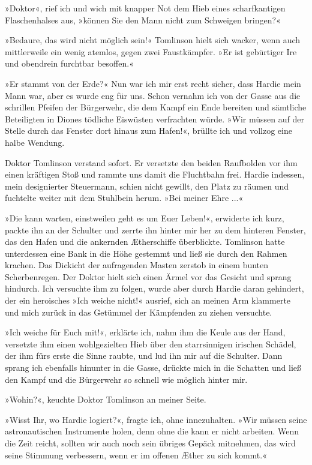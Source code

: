 »Doktor«, rief ich und wich mit knapper Not dem Hieb eines
scharfkantigen Flaschenhalses aus, »können Sie den Mann nicht zum
Schweigen bringen?«

»Bedaure, das wird nicht möglich sein!« Tomlinson hielt sich
wacker, wenn auch mittlerweile ein wenig atemlos, gegen zwei
Faustkämpfer. »Er ist gebürtiger Ire und obendrein furchtbar
besoffen.«

»Er stammt von der Erde?« Nun war ich mir erst recht sicher, dass
Hardie mein Mann war, aber es wurde eng für uns. Schon vernahm ich
von der Gasse aus die schrillen Pfeifen der Bürgerwehr, die dem
Kampf ein Ende bereiten und sämtliche Beteiligten in Diones
tödliche Eiswüsten verfrachten würde. »Wir müssen auf der Stelle
durch das Fenster dort hinaus zum Hafen!«, brüllte ich und vollzog
eine halbe Wendung.

Doktor Tomlinson verstand sofort. Er versetzte den beiden
Raufbolden vor ihm einen kräftigen Stoß und rammte uns damit die
Fluchtbahn frei. Hardie indessen, mein designierter Steuermann,
schien nicht gewillt, den Platz zu räumen und fuchtelte weiter mit
dem Stuhlbein herum. »Bei meiner Ehre ...«

»Die kann warten, einstweilen geht es um Euer Leben!«, erwiderte
ich kurz, packte ihn an der Schulter und zerrte ihn hinter mir her
zu dem hinteren Fenster, das den Hafen und die ankernden
Ætherschiffe überblickte. Tomlinson hatte unterdessen eine Bank in
die Höhe gestemmt und ließ sie durch den Rahmen krachen. Das
Dickicht der aufragenden Masten zerstob in einem bunten
Scherbenregen. Der Doktor hielt sich einen Ärmel vor das Gesicht
und sprang hindurch. Ich versuchte ihm zu folgen, wurde aber durch
Hardie daran gehindert, der ein heroisches »Ich weiche nicht!«
ausrief, sich an meinen Arm klammerte und mich zurück in das
Getümmel der Kämpfenden zu ziehen versuchte.

»Ich weiche für Euch mit!«, erklärte ich, nahm ihm die Keule aus
der Hand, versetzte ihm einen wohlgezielten Hieb über den
starrsinnigen irischen Schädel, der ihm fürs erste die Sinne
raubte, und lud ihn mir auf die Schulter. Dann sprang ich ebenfalls
hinunter in die Gasse, drückte mich in die Schatten und ließ den
Kampf und die Bürgerwehr so schnell wie möglich hinter mir.

\bigpar

»Wohin?«, keuchte Doktor Tomlinson an meiner Seite.

»Wisst Ihr, wo Hardie logiert?«, fragte ich, ohne innezuhalten.
»Wir müssen seine astronautischen Instrumente holen, denn ohne die
kann er nicht arbeiten. Wenn die Zeit reicht, sollten wir auch noch
sein übriges Gepäck mitnehmen, das wird seine Stimmung verbessern,
wenn er im offenen Æther zu sich kommt.«


